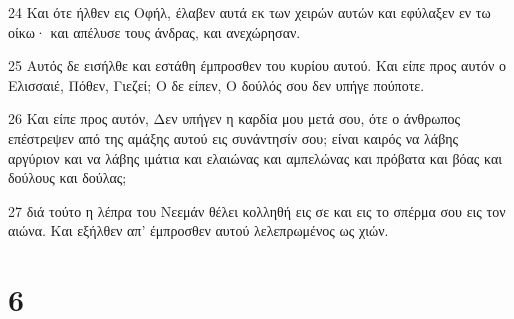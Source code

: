 \par 24 Και ότε ήλθεν εις Οφήλ, έλαβεν αυτά εκ των χειρών αυτών και εφύλαξεν εν τω οίκω· και απέλυσε τους άνδρας, και ανεχώρησαν.
\par 25 Αυτός δε εισήλθε και εστάθη έμπροσθεν του κυρίου αυτού. Και είπε προς αυτόν ο Ελισσαιέ, Πόθεν, Γιεζεί; Ο δε είπεν, Ο δούλός σου δεν υπήγε πούποτε.
\par 26 Και είπε προς αυτόν, Δεν υπήγεν η καρδία μου μετά σου, ότε ο άνθρωπος επέστρεψεν από της αμάξης αυτού εις συνάντησίν σου; είναι καιρός να λάβης αργύριον και να λάβης ιμάτια και ελαιώνας και αμπελώνας και πρόβατα και βόας και δούλους και δούλας;
\par 27 διά τούτο η λέπρα του Νεεμάν θέλει κολληθή εις σε και εις το σπέρμα σου εις τον αιώνα. Και εξήλθεν απ' έμπροσθεν αυτού λελεπρωμένος ως χιών.

\chapter{6}

